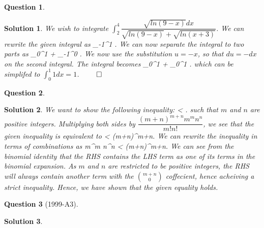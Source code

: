 \documentclass{article} %
\def\eQb#1\eQe{\begin{eqnarray*}#1\end{eqnarray*}}
\theoremstyle{quest}
\newtheorem*{question}{Question}
\newtheorem*{solution}{Solution}
\begin{document}
\begin{question}
\end{question}
\begin{solution}
We wish to integrate $\int_{2}^{4} \dfrac{\sqrt{ln(9-x)}dx}{\sqrt{ln(9-x)} 
+ \sqrt{ln(x+3)}}$. We can rewrite the given integral as 
\eQb
\int_{-1}^{1} . 
\eQe
We can now separate the integral to two parts as
\eQb
\int_{0}^{1} 
+  
\int_{-1}^{0} .
\eQe
We now use the substitution $u = -x$, so that $du = -dx$ on the second integral.
The integral becomes
\eQb
\int_{0}^{1} 
+  
\int_{0}^{1} .
\eQe
which can be simplifed to $\int_{0}^{1} 1dx = 1$. $\qed$
\end{solution}

\bigskip

\begin{question}
\end{question}
\begin{solution}
We want to show the following inequality: 
\eQb
\dfrac{(m+n)!}{(m+n)^{m+n}} < .
\eQe
such that $m$ and $n$ are positive integers. Multiplying both sides 
by $\dfrac{(m+n)^{m+n}m^m n^n}{m!n!}$, we see that
the given inequality is equivalent to
\eQb
\dfrac{m^m n^n (m+n)!}{m!n!} < (m+n)^{m+n}.
\eQe
We can rewrite the inequality in terms of combinations as 
\eQb
{m+n \choose m}m^m n^n < (m+n)^{m+n}.
\eQe 
We can see from the binomial identity that the RHS contains the LHS term as one 
of its terms in the binomial expansion. As $m$ and $n$ are restricted
to be positive integers, the RHS will always contain another term with the
${m+n \choose 0}$ coffecient, hence acheiving a strict inequality. Hence,
we have shown that the given equality holds.
\end{solution}

\begin{question}[1999-A3]
\end{question}
\begin{solution}
\end{solution}
\end{document}
